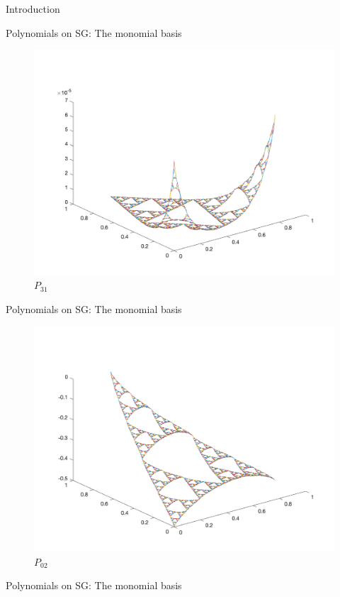 \documentclass[xcolor = dvipsnames]{beamer}
\begin{document}
\begin{section}{Introduction}
\begin{frame}{Polynomials on SG: The monomial basis}
    \begin{figure}[H]
        \centering
        \includegraphics[width=0.75\linewidth]{monomial3_1.png}
        \caption{$P_{31}$}
    \end{figure}
\end{frame}

\begin{frame}{Polynomials on SG: The monomial basis}

    \begin{figure}[H]
        \centering
        
        \includegraphics[width=0.75\linewidth]{monomial0_2.png}
        \caption{$P_{02}$}
        
    \end{figure}
    
\end{frame}

\begin{frame}{Polynomials on SG: The monomial basis}

    \begin{figure}[H]
        \centering
        

\end{figure}
\end{frame}
\end{section}
\end{document}
